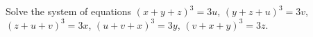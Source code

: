 Solve the system of equations $(x + y + z)^3 = 3u$, $(y + z + u)^3 = 3v$, $(z + u + v)^3 = 3x$, $(u + v + x)^3 = 3y$, $(v + x + y)^3 = 3z$.

